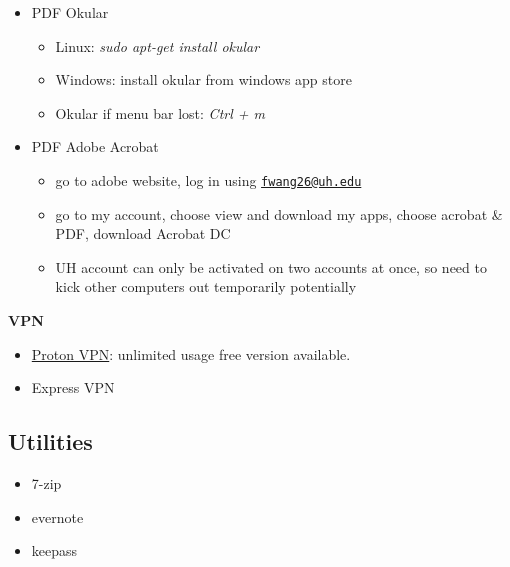 \documentclass[]{article}
\providecommand{\tightlist}{%
  \setlength{\itemsep}{0pt}\setlength{\parskip}{0pt}}
\begin{document}
\begin{itemize}
\tightlist
\item
  PDF Okular

  \begin{itemize}
  \tightlist
  \item
    Linux: \emph{sudo apt-get install okular}
  \item
    Windows: install okular from windows app store
  \item
    Okular if menu bar lost: \emph{Ctrl + m}
  \end{itemize}
\item
  PDF Adobe Acrobat

  \begin{itemize}
  \tightlist
  \item
    go to adobe website, log in using
    \href{mailto:fwang26@uh.edu}{\nolinkurl{fwang26@uh.edu}}
  \item
    go to my account, choose view and download my apps, choose acrobat
    \& PDF, download Acrobat DC
  \item
    UH account can only be activated on two accounts at once, so need to
    kick other computers out temporarily potentially
  \end{itemize}
\end{itemize}

\textbf{VPN}

\begin{itemize}
\tightlist
\item
  \href{https://protonvpn.com/}{Proton VPN}: unlimited usage free
  version available.
\item
  Express VPN
\end{itemize}

\hypertarget{utilities}{%
\subsection{Utilities}\label{utilities}}

\begin{itemize}
\tightlist
\item
  7-zip
\item
  evernote
\item
  keepass
\end{itemize}
\end{document}
